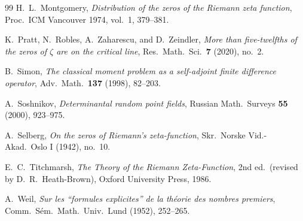 \documentclass[11pt]{article}
\numberwithin{equation}{section}
\theoremstyle{definition}
\theoremstyle{remark}
\begin{document}
\begin{thebibliography}{99}
 H.~L.~Montgomery, \emph{Distribution of the zeros
of the Riemann zeta function}, Proc.\ ICM Vancouver 1974, vol.~1,
379--381.

 K.~Pratt, N.~Robles, A.~Zaharescu, and
D.~Zeindler, \emph{More than five-twelfths of the zeros of
$\zeta$ are on the critical line}, Res.\ Math.\ Sci.\ \textbf{7}
(2020), no.~2.

 B.~Simon, \emph{The classical moment problem
as a self-adjoint finite difference operator}, Adv.\ Math.\
\textbf{137} (1998), 82--203.

 A.~Soshnikov, \emph{Determinantal random
point fields}, Russian Math.\ Surveys \textbf{55} (2000),
923--975.

 A.~Selberg, \emph{On the zeros of Riemann's
zeta-function}, Skr.\ Norske Vid.-Akad.\ Oslo I (1942), no.~10.

 E.~C.~Titchmarsh, \emph{The Theory of the
Riemann Zeta-Function}, 2nd ed.\ (revised by D.~R.~Heath-Brown),
Oxford University Press, 1986.

 A.~Weil, \emph{Sur les ``formules explicites''
de la th\'eorie des nombres premiers}, Comm.\ S\'em.\ Math.\
Univ.\ Lund (1952), 252--265.

\end{thebibliography}
\end{document}
